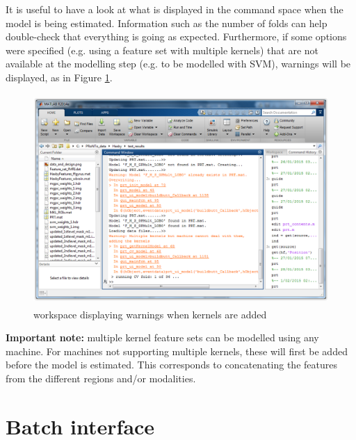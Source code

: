 It is useful to have a look at what is displayed in the \matlab command space when the model is being estimated. Information such as the number of folds can help double-check that everything is going as expected. Furthermore, if some options were specified (e.g. using a feature set with multiple kernels) that are not available at the modelling step (e.g. to be modelled with SVM), warnings will be displayed, as in Figure \ref{fig_ws_matlab}.

\begin{figure}[!h]
\begin{center}
\includegraphics[height=8cm]{images/matlab_workspace_model.PNG}
\caption{\matlab workspace displaying warnings when kernels are added}
 \label{fig_ws_matlab}
\end{center}
\end{figure}

\textbf{Important note:} multiple kernel feature sets can be modelled using any machine. For machines not supporting multiple kernels, these will first be added before the model is estimated. This corresponds to concatenating the features from the different regions and/or modalities.

\section{Batch interface}

